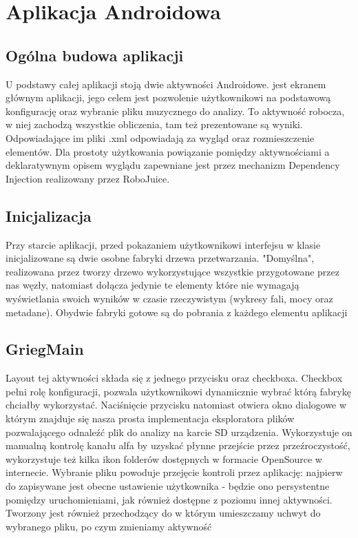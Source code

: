 \chapter{Aplikacja Androidowa}
\section{Ogólna budowa aplikacji}
U podstawy całej aplikacji stoją dwie aktywności Androidowe.  jest ekranem głównym aplikacji, jego celem jest pozwolenie użytkownikowi na podstawową konfigurację oraz wybranie pliku muzycznego do analizy.  To aktywność robocza, w niej zachodzą wszystkie obliczenia, tam też prezentowane są wyniki. Odpowiadające im pliki .xml odpowiadają za wygląd oraz rozmieszczenie elementów. Dla prostoty użytkowania powiązanie pomiędzy aktywnościami a deklaratywnym opisem wyglądu zapewniane jest przez mechanizm Dependency Injection realizowany przez RoboJuice.

\section{Inicjalizacja}
Przy starcie aplikacji, przed pokazaniem użytkownikowi interfejsu w klasie  inicjalizowane są dwie osobne fabryki drzewa przetwarzania. "Domyślna", realizowana przez  tworzy drzewo wykorzystujące wszystkie przygotowane przez nas węzły, natomiast  dołącza jedynie te elementy które nie wymagają wyświetlania swoich wyników w czasie rzeczywistym (wykresy fali, mocy oraz metadane). Obydwie fabryki gotowe są do pobrania z każdego elementu aplikacji

\section{GriegMain}
Layout tej aktywności składa się z jednego przycisku oraz checkboxa. Checkbox pełni rolę konfiguracji, pozwala użytkownikowi dynamicznie wybrać którą fabrykę chciałby wykorzystać. Naciśnięcie przycisku natomiast otwiera okno dialogowe w którym znajduje się nasza prosta implementacja eksploratora plików pozwalającego odnaleźć plik do analizy na karcie SD urządzenia. Wykorzystuje on manualną kontrolę kanału alfa by uzyskać płynne przejście przez przeźroczystość, wykorzystuje też kilka ikon folderów dostępnych w formacie OpenSource w internecie. Wybranie pliku powoduje przejęcie kontroli przez aplikację: najpierw do  zapisywane jest obecne ustawienie użytkownika - będzie ono persystentne pomiędzy uruchomieniami, jak również dostępne z poziomu innej aktywności. Tworzony jest również  przechodzący do  w którym umieszczamy uchwyt do wybranego pliku, po czym zmieniamy aktywność

